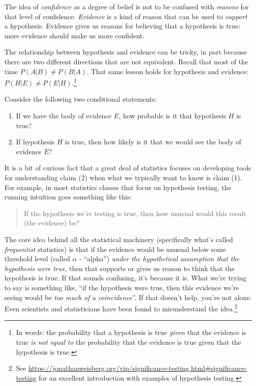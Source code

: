 \documentclass[]{tufte-book}
\providecommand{\tightlist}{%
  \setlength{\itemsep}{0pt}\setlength{\parskip}{0pt}}
\begin{document}
The idea of \emph{confidence} as a degree of belief is not to be confused with \emph{reasons} for that level of confidence. \emph{Evidence} is a kind of reason that can be used to \emph{support} a hypothesis. Evidence gives us reasons for believing that a hypothesis is true: more evidence should make us more confident.

The relationship between hypothesis and evidence can be tricky, in part because there are two different directions that are not equivalent. Recall that most of the time \(P(A|B)\neq P(B|A)\). That same lesson holds for hypothesis and evidence: \(P(H|E)\neq P(E|H)\).\footnote{In words: the probability that a hypothesis is true \emph{given} that the evidence is true \emph{is not equal to} the probability that the evidence is true given that the hypothesis is true.}

Consider the following two conditional statements:

\begin{enumerate}
\def\labelenumi{\arabic{enumi}.}
\tightlist
\item
  If we have the body of evidence \(E\), how probable is it that hypothesis \(H\) is true?
\item
  If hypothesis \(H\) is true, then how likely is it that we would see the body of evidence \(E\)?
\end{enumerate}

It is a bit of curious fact that a great deal of statistics focuses on developing tools for understanding claim (2) when what we typically want to know is claim (1). For example, in most statistics classes that focus on hypothesis testing, the running intuition goes something like this:

\begin{quote}
If the hypothesis we're testing is true, then how unusual would this result (the evidence) be?
\end{quote}

The core idea behind all the statistical machinery (specifically what's called \emph{frequentist} statistics) is that if the evidence would be unusual below some threshold level (called \(\alpha\) - ``alpha'') \emph{under the hypothetical assumption that the hypothesis were true}, then that supports or gives us reason to think that the hypothesis is true. If that sounds confusing, it's because it is. What we're trying to say is something like, ``if the hypothesis were true, then this evidence we're seeing would be \emph{too much of a coincidence}''. If that doesn't help, you're not alone. Even scientists and statisticians have been found to misunderstand the idea.\footnote{See \url{https://jonathanweisberg.org/vip/significance-testing.html\#significance-testing} for an excellent introduction with examples of hypothesis testing.}
\end{document}
